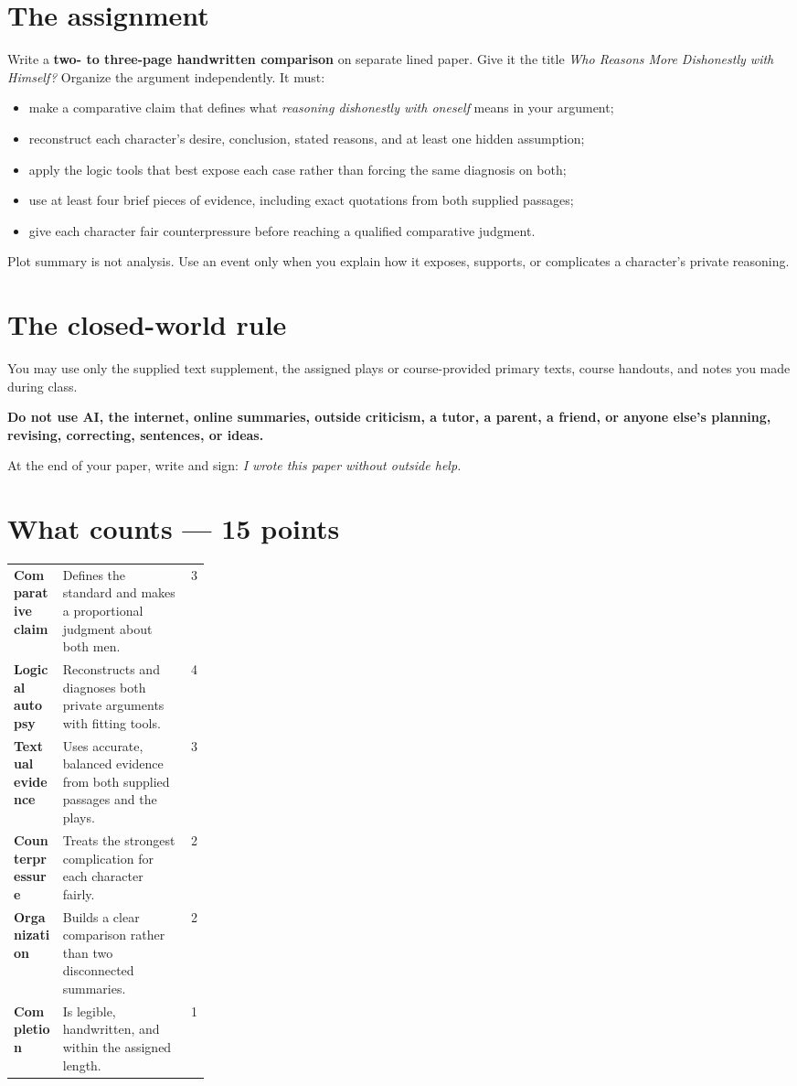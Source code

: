 \documentclass[11pt]{article}
\begin{document}
\section*{The assignment}
Write a \textbf{two- to three-page handwritten comparison} on separate lined paper. Give it the title \textit{Who Reasons More Dishonestly with Himself?} Organize the argument independently. It must:
\begin{itemize}
\item make a comparative claim that defines what \emph{reasoning dishonestly with oneself} means in your argument;
\item reconstruct each character's desire, conclusion, stated reasons, and at least one hidden assumption;
\item apply the logic tools that best expose each case rather than forcing the same diagnosis on both;
\item use at least four brief pieces of evidence, including exact quotations from both supplied passages;
\item give each character fair counterpressure before reaching a qualified comparative judgment.
\end{itemize}
Plot summary is not analysis. Use an event only when you explain how it exposes, supports, or complicates a character's private reasoning.

\section*{The closed-world rule}
You may use only the supplied text supplement, the assigned plays or course-provided primary texts, course handouts, and notes you made during class.

\textbf{Do not use AI, the internet, online summaries, outside criticism, a tutor, a parent, a friend, or anyone else's planning, revising, correcting, sentences, or ideas.}

At the end of your paper, write and sign: \emph{I wrote this paper without outside help.}

\section*{What counts --- 15 points}
\begin{tabularx}{\linewidth}{>{\bfseries}p{0.25\linewidth}Xr}
Comparative claim & Defines the standard and makes a proportional judgment about both men. & 3\\
Logical autopsy & Reconstructs and diagnoses both private arguments with fitting tools. & 4\\
Textual evidence & Uses accurate, balanced evidence from both supplied passages and the plays. & 3\\
Counterpressure & Treats the strongest complication for each character fairly. & 2\\
Organization & Builds a clear comparison rather than two disconnected summaries. & 2\\
Completion & Is legible, handwritten, and within the assigned length. & 1\\
\end{tabularx}
\endgroup
\end{document}
